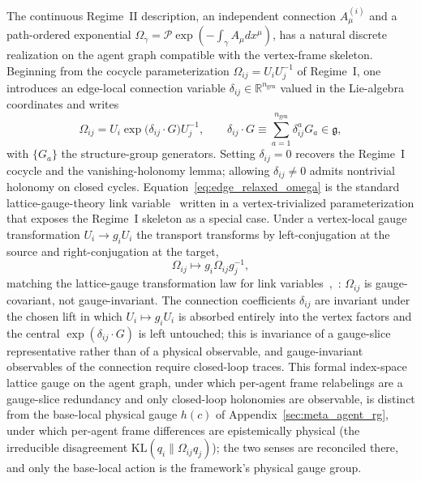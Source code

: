 \documentclass[11pt]{article}
\begin{document}
The continuous Regime~II description, an independent connection $A^{(i)}_\mu$ and a path-ordered exponential $\Omega_\gamma = \mathcal{P}\exp(-\int_\gamma A_\mu dx^\mu)$, has a natural discrete realization on the agent graph compatible with the vertex-frame skeleton. Beginning from the cocycle parameterization $\Omega_{ij} = U_iU_j^{-1}$ of Regime~I, one introduces an edge-local connection variable $\delta_{ij} \in \mathbb{R}^{n_{\mathrm{gen}}}$ valued in the Lie-algebra coordinates and writes
\begin{equation}
\Omega_{ij} = U_i \exp\big(\delta_{ij}\cdot G\big) U_j^{-1},
\qquad
\delta_{ij}\cdot G \equiv \sum_{a=1}^{n_{\mathrm{gen}}} \delta_{ij}^{a} G_a \in \mathfrak{g},
\label{eq:edge_relaxed_omega}
\end{equation}
with $\{G_a\}$ the structure-group generators. Setting $\delta_{ij}=0$ recovers the Regime~I cocycle and the vanishing-holonomy lemma; allowing $\delta_{ij}\neq 0$ admits nontrivial holonomy on closed cycles. Equation~\eqref{eq:edge_relaxed_omega} is the standard lattice-gauge-theory link variable~\cite{WilsonConfinement1974, KogutSusskind1975, Creutz1983} written in a vertex-trivialized parameterization that exposes the Regime~I skeleton as a special case. Under a vertex-local gauge transformation $U_i \to g_i U_i$ the transport transforms by left-conjugation at the source and right-conjugation at the target,
\begin{equation}
\Omega_{ij} \longmapsto g_i \Omega_{ij} g_j^{-1},
\label{eq:omega_gauge_law}
\end{equation}
matching the lattice-gauge transformation law for link variables~\cite[Eq.~12]{WilsonConfinement1974},~\cite[ch.~5 Eq.~5.1]{Creutz1983}: $\Omega_{ij}$ is gauge-covariant, not gauge-invariant. The connection coefficients $\delta_{ij}$ are invariant under the chosen lift in which $U_i \mapsto g_i U_i$ is absorbed entirely into the vertex factors and the central $\exp(\delta_{ij}\cdot G)$ is left untouched; this is invariance of a gauge-slice representative rather than of a physical observable, and gauge-invariant observables of the connection require closed-loop traces. This formal index-space lattice gauge on the agent graph, under which per-agent frame relabelings are a gauge-slice redundancy and only closed-loop holonomies are observable, is distinct from the base-local physical gauge $h(c)$ of Appendix~\ref{sec:meta_agent_rg}, under which per-agent frame differences are epistemically physical (the irreducible disagreement $\mathrm{KL}(q_i \| \Omega_{ij}q_j)$); the two senses are reconciled there, and only the base-local action is the framework's physical gauge group.
\end{document}
